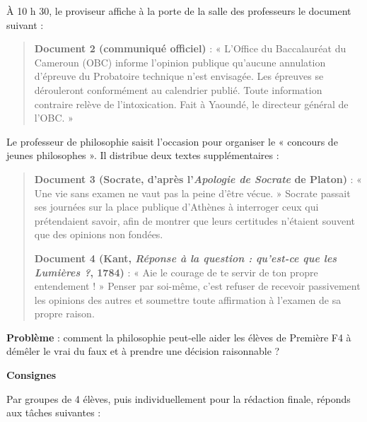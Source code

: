 \documentclass[11pt]{article}
\begin{document}
À 10 h 30, le proviseur affiche à la porte de la salle des professeurs le document suivant :

\begin{quote}
\textbf{Document 2 (communiqué officiel)} : « L'Office du Baccalauréat du Cameroun (OBC) informe l'opinion publique qu'aucune annulation d'épreuve du Probatoire technique n'est envisagée. Les épreuves se dérouleront conformément au calendrier publié. Toute information contraire relève de l'intoxication. Fait à Yaoundé, le directeur général de l'OBC. »
\end{quote}

Le professeur de philosophie saisit l'occasion pour organiser le « concours de jeunes philosophes ». Il distribue deux textes supplémentaires :

\begin{quote}
\textbf{Document 3 (Socrate, d'après l'\emph{Apologie de Socrate} de Platon)} : « Une vie sans examen ne vaut pas la peine d'être vécue. » Socrate passait ses journées sur la place publique d'Athènes à interroger ceux qui prétendaient savoir, afin de montrer que leurs certitudes n'étaient souvent que des opinions non fondées.

\textbf{Document 4 (Kant, \emph{Réponse à la question : qu'est-ce que les Lumières ?}, 1784)} : « Aie le courage de te servir de ton propre entendement ! » Penser par soi-même, c'est refuser de recevoir passivement les opinions des autres et soumettre toute affirmation à l'examen de sa propre raison.
\end{quote}

\textbf{Problème} : comment la philosophie peut-elle aider les élèves de Première F4 à démêler le vrai du faux et à prendre une décision raisonnable ?

\textbf{Consignes}\par
Par groupes de 4 élèves, puis individuellement pour la rédaction finale, réponds aux tâches suivantes :
\end{document}

